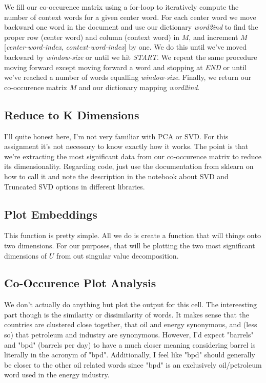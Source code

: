 \documentclass[12pt]{article}
\begin{document}
We fill our co-occurence matrix using a for-loop to iteratively compute the number of context words
for a given center word. For each center word we move backward one word in the document and use our dictionary 
\emph{word2ind} to find the proper row (center word) and column (context word) in $M$, and increment 
$M$[\emph{center-word-index}, \emph{context-word-index}] by one. We do this until we've moved backward 
by \emph{window-size} or until we hit \emph{START}. We repeat the same procedure moving forward
except moving forward a word and stopping at \emph{END} or until we've reached a number of words equalling \emph{window-size}. 
Finally, we return our co-occurence matrix $M$ and our dictionary mapping \emph{word2ind}. 

\subsection{Reduce to K Dimensions}
I'll quite honest here, I'm not very familiar with PCA or SVD. For this assignment it's not necessary 
to know exactly how it works. The point is that we're extracting the most significant data from our 
co-occurence matrix to reduce its dimensionality. Regarding code, just use the documentation from sklearn
on how to call it and note the description in the notebook about SVD and Truncated SVD options in different libraries. 

\subsection{Plot Embeddings}
This function is pretty simple. All we do is create a function that will things
onto two dimensions. For our purposes, that will be plotting the two most significant
dimensions of $U$ from out singular value decomposition. 

\subsection{Co-Occurence Plot Analysis}
We don't actually do anything but plot the output for this cell. The intereesting part though is 
the similarity or dissimilarity of words. It makes sense that the countries are clustered close 
together, that oil and energy synonymous, and (less so) that petroleum and industry are synonymous. 
However, I'd expect "barrels" and "bpd" (barrels per day) to have a much closer meaning considering
barrel is literally in the acronym of "bpd". Additionally, I feel like "bpd" should generally be 
closer to the other oil related words since "bpd" is an exclusively oil/petroleum word used in the 
energy industry. 
\end{document}
